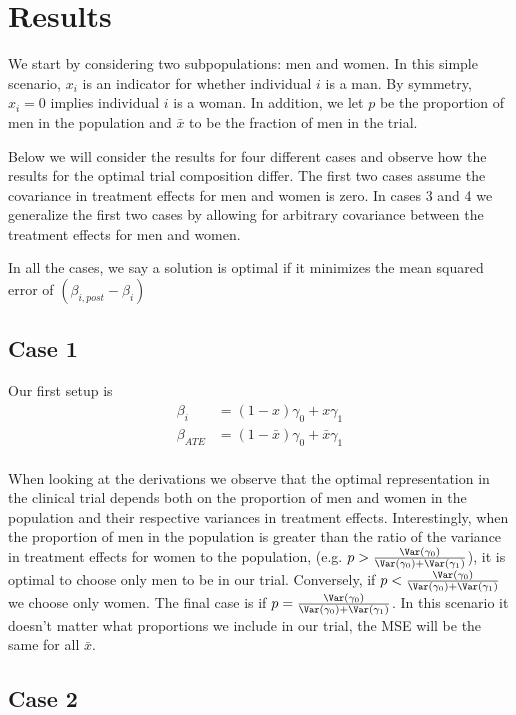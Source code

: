 \section{Results}


We start by considering two subpopulations: men and women. In this simple scenario, $x_i$ is an indicator for whether individual $i$ is a man.  
By symmetry, $x_i=0$ implies individual $i$ is a woman.
In addition, we let $p$ be the proportion of men in the population and $\bar{x}$ to be the fraction of men in the trial. 

Below we will consider the results for four different cases and observe how the results for the optimal trial composition differ. The first two cases assume the covariance in treatment effects for men and women is zero.
In cases 3 and 4 we generalize the first two cases by allowing for arbitrary covariance between the treatment effects for men and women.


In all the cases, we say a solution is optimal if it minimizes the mean squared error of 
$(\beta_{i,post} - \beta_{i})$

\subsection*{Case 1}
Our first setup is
\begin{align*}
	\beta_i &= (1 - x) \gamma_0 + x \gamma_1 \\
	\beta_{ATE} &= (1 - \bar{x}) \gamma_0 + \bar{x} \gamma_1 \\
\end{align*}

When looking at the derivations we observe that the optimal representation in the clinical trial depends both on the proportion of men and women in the population and their respective variances in treatment effects.
Interestingly, when the proportion of men in the population is greater than the ratio of the variance in treatment effects for women to the population, (e.g.
$p > \frac{\Var(\gamma_0)}{ \Var(\gamma_0) + \Var(\gamma_1)}$), it is optimal to choose only men to be in our trial. 
Conversely, if $p < \frac{\Var(\gamma_0)}{ \Var(\gamma_0) + \Var(\gamma_1)}$ we choose only women.
The final case is if $p = \frac{\Var(\gamma_0)}{ \Var(\gamma_0) + \Var(\gamma_1)}$. 
In this scenario it doesn't matter what proportions we include in our trial, the MSE will be the same for all $\bar{x}$.

\subsection*{Case 2}

